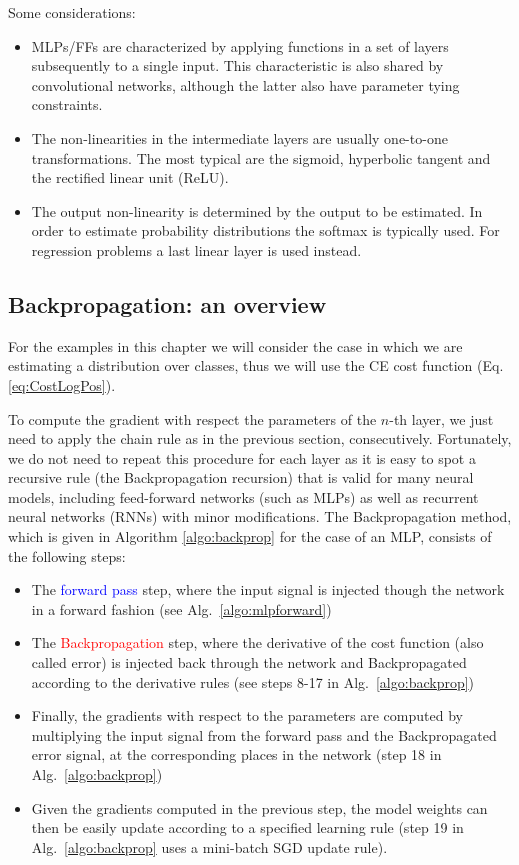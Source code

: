 \noindent Some considerations:
%
\begin{itemize}
\item MLPs/FFs are characterized by applying functions in a set of layers subsequently to a single input. This characteristic is also shared by convolutional networks, although the latter also have parameter tying constraints.
\item The non-linearities in the intermediate layers are usually one-to-one transformations. The most typical are the sigmoid, hyperbolic tangent and the rectified linear unit (ReLU).
\item The output non-linearity is determined by the output to be estimated. In order to estimate probability distributions the softmax is typically used. For regression problems a last linear layer is used instead.
\end{itemize}

\subsection{Backpropagation: an overview}

For the examples in this chapter we will consider the case in which we are
estimating a distribution over classes, thus we will use the CE cost function
(Eq. \ref{eq:CostLogPos}).

To compute the gradient with respect the parameters of the $n$-th layer, we
just need to apply the chain rule as in the previous section, consecutively.
Fortunately, we do not need to repeat this procedure for each layer as it is
easy to spot a recursive rule (the Backpropagation recursion) that is valid
for many neural models, including feed-forward networks (such as MLPs) as well
as recurrent neural networks (RNNs) with minor modifications. The
Backpropagation method, which is given in Algorithm \ref{algo:backprop} for
the case of an MLP, consists of the following steps:

\begin{itemize}
\item The \textcolor{blue}{forward pass} step, where the input signal is injected though the network  in a forward fashion (see Alg.~\ref{algo:mlpforward})
\item The \textcolor{red}{Backpropagation} step, where the derivative of the cost function (also called error) is injected back through the network and Backpropagated according to the derivative rules (see steps 8-17 in Alg.~\ref{algo:backprop})
\item Finally, the gradients with respect to the parameters are computed by multiplying the input signal from the forward pass and the Backpropagated error signal, at the corresponding places in the network (step 18 in Alg.~\ref{algo:backprop})
\item Given the gradients computed in the previous step, the model weights can then be easily update according to a specified learning rule (step 19 in Alg.~\ref{algo:backprop} uses a mini-batch SGD update rule).
\end{itemize}

